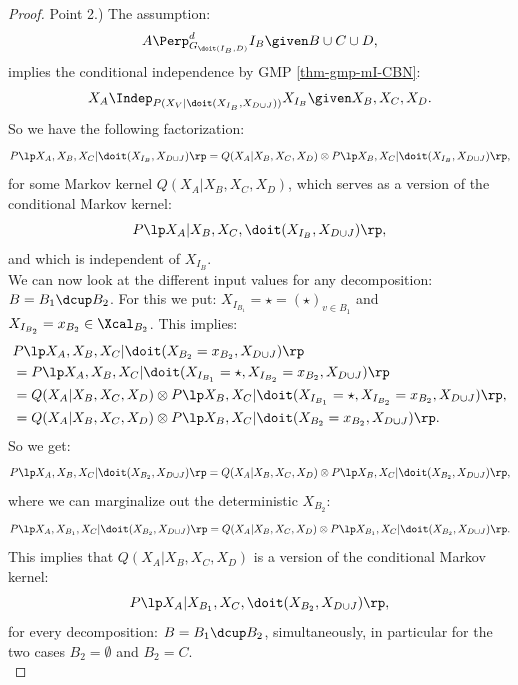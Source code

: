 \begin{Cor}[Do-calculus]
\begin{proof}
Point 2.) The assumption:
            \[ A \Perp^d_{G_{\doit(I_B,D)}} I_B \given B \cup C \cup D,   \]
implies the conditional independence by GMP \ref{thm-gmp-mI-CBN}:
  \[ X_A \Indep_{P(X_V|\doit(X_{I_B},X_{D\cup J}))} X_{I_B} \given X_B,X_C,X_D.\]
So we have the following factorization:
  \[ P\lp X_A,X_B,X_C|\doit(X_{I_B},X_{D\cup J})\rp = Q(X_A|X_B,X_C,X_D) \otimes P\lp X_B,X_C|\doit(X_{I_B},X_{D\cup J})\rp,\]
for some Markov kernel $Q(X_A|X_B,X_C,X_D)$, which serves as a version of the conditional Markov kernel:
  \[P\lp X_A|X_B,X_C,\doit(X_{I_B},X_{D\cup J})\rp,\]
and which is independent of $X_{I_B}$.\\
We can now look at the different input values for any decomposition: $B=B_1 \dcup B_2$.
For this we put: $X_{I_{B_1}}= \star = (\star)_{v \in B_1}$ and  $ X_{I_{B_2}}=x_{B_2} \in \Xcal_{B_2}$.
This implies: 
\begin{align*} 
  & P\lp X_A,X_B,X_C|\doit(X_{{B_2}}=x_{B_2},X_{D\cup J})\rp \\
  &= P\lp X_A,X_B,X_C|\doit(X_{I_{B_1}}=\star,X_{I_{B_2}}=x_{B_2},X_{D\cup J})\rp \\
  &= Q(X_A|X_B,X_C,X_D) \otimes P\lp X_B,X_C|\doit(X_{I_{B_1}}=\star,X_{I_{B_2}}=x_{B_2},X_{D\cup J})\rp,\\
  &= Q(X_A|X_B,X_C,X_D) \otimes P\lp X_B,X_C|\doit(X_{{B_2}}=x_{B_2},X_{D\cup J})\rp.
\end{align*}
So we get:
  \[P\lp X_A,X_B,X_C|\doit(X_{B_2},X_{D\cup J})\rp 
  = Q(X_A|X_B,X_C,X_D) \otimes P\lp X_B,X_C|\doit(X_{B_2},X_{D\cup J})\rp,\]
where we can marginalize out the deterministic $X_{B_2}$:
  \[P\lp X_A,X_{B_1},X_C|\doit(X_{B_2},X_{D\cup J})\rp 
  = Q(X_A|X_B,X_C,X_D) \otimes P\lp X_{B_1},X_C|\doit(X_{B_2},X_{D\cup J})\rp.\]
This implies that $Q(X_A|X_B,X_C,X_D)$ is a version of the conditional Markov kernel:
  \[P\lp X_A|X_{B_1},X_C,\doit(X_{B_2},X_{D\cup J})\rp,\]
for every decomposition: $B=B_1 \dcup B_2$, simultaneously, in particular for the two cases
$B_2=\emptyset$ and $B_2 = C$.\\



\end{proof}
\end{Cor}
